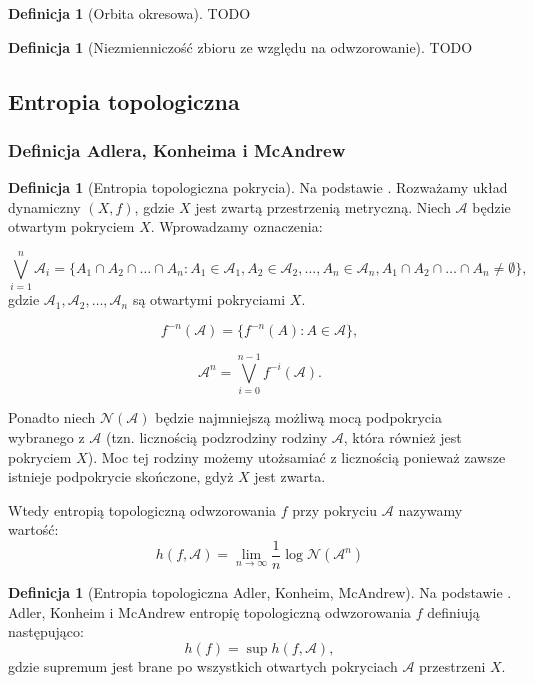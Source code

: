 \documentclass[licencjacka]{pwr_wmat_praca_dyplomowa}
\theoremstyle{plain}
\numberwithin{theorem}{chapter}
\theoremstyle{definition}
\numberwithin{theorem}{chapter}
\newtheorem{definition}[theorem]{Definicja}
\begin{document}
\begin{definition}[Orbita okresowa]
TODO
\end{definition}

\begin{definition}[Niezmienniczość zbioru ze względu na odwzorowanie]
TODO
\end{definition}



\subsection{Entropia topologiczna}

\subsubsection{Definicja Adlera, Konheima i McAndrew}

\begin{definition}[Entropia topologiczna pokrycia]
Na podstawie \cite{misiurewicz1993}.
Rozważamy układ dynamiczny $(X, f)$, gdzie $X$ jest zwartą przestrzenią metryczną. Niech $\mathcal{A}$ będzie otwartym pokryciem $X$.
Wprowadzamy oznaczenia:

$$\bigvee_{i=1}^n \mathcal{A}_i = \{A_1 \cap A_2 \cap \ldots \cap A_n : A_1 \in \mathcal{A}_1, A_2 \in \mathcal{A}_2, \ldots, A_n \in \mathcal{A}_n, A_1 \cap A_2 \cap \ldots \cap A_n \neq \emptyset \},$$ 
gdzie $\mathcal{A}_1, \mathcal{A}_2, \ldots, \mathcal{A}_n$ są otwartymi pokryciami $X$.

$$f^{-n}(\mathcal{A}) = \{f^{-n}(A):A\in \mathcal{A}\},$$

$$\mathcal{A}^n = \bigvee_{i=0}^{n-1}f^{-i}(\mathcal{A}).$$

Ponadto niech $\mathcal{N}(\mathcal{A})$ będzie najmniejszą możliwą mocą podpokrycia wybranego z $\mathcal{A}$ (tzn. licznością podzrodziny rodziny $\mathcal{A}$, która również jest pokryciem $X$). Moc tej rodziny możemy utożsamiać z licznością ponieważ zawsze istnieje podpokrycie skończone, gdyż $X$ jest zwarta.

Wtedy entropią topologiczną odwzorowania $f$ przy pokryciu $\mathcal{A}$ nazywamy wartość:
$$h(f, \mathcal{A}) = \lim_{n \rightarrow \infty}{\frac{1}{n}\log\mathcal{N}(\mathcal{A}^n)}$$
\end{definition}

\begin{definition}[Entropia topologiczna Adler, Konheim, McAndrew]
Na podstawie \cite{misiurewicz1993}.
Adler, Konheim i McAndrew entropię topologiczną odwzorowania $f$ definiują następująco: 
$$h(f) = \sup h(f, \mathcal{A}),$$ gdzie supremum jest brane po wszystkich otwartych pokryciach $\mathcal{A}$ przestrzeni $X$.
\end{definition}
\end{document}
